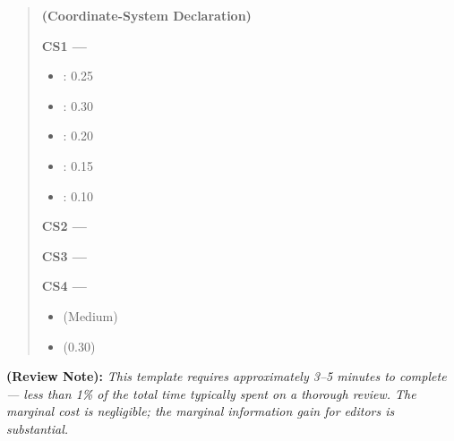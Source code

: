 \documentclass[12pt,a4paper]{article}
\theoremstyle{remark}
\newcommand{\reviewnote}[1]{%
    \medskip\noindent
    \textbf{ (Review Note):} \textit{#1}%
}
\begin{document}
\begin{quotation}
\noindent\textbf{ (Coordinate-System Declaration)}

\noindent\textbf{CS1 — }
\begin{itemize}
    \item : 0.25
    \item : 0.30
    \item : 0.20
    \item : 0.15
    \item : 0.10
\end{itemize}

\noindent\textbf{CS2 — }

\noindent\textbf{CS3 — }

\noindent\textbf{CS4 — }
\begin{itemize}
    \item  (Medium)
    \item (0.30)
\end{itemize}
\end{quotation}

\reviewnote{This template requires approximately 3--5 minutes to complete — less than 1\% of the total time typically spent on a thorough review. The marginal cost is negligible; the marginal information gain for editors is substantial.}
\end{document}
